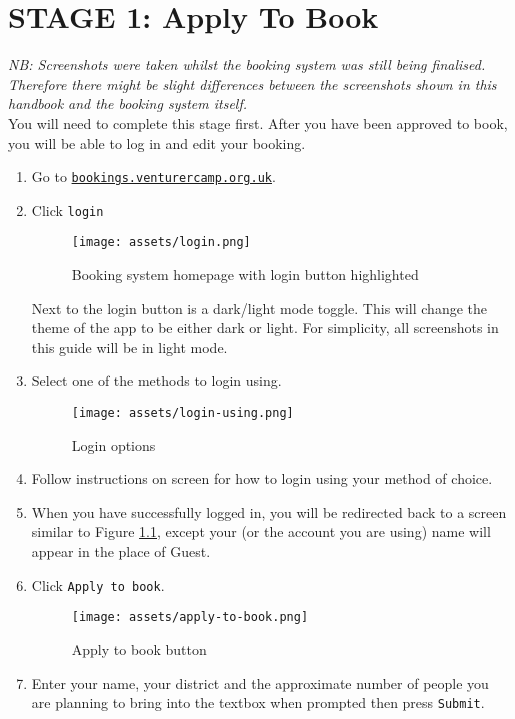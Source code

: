 \chapter{STAGE 1: Apply To Book}
\label{chap:apply}
\textit{NB: Screenshots were taken whilst the booking system was still being finalised. Therefore there might be slight differences between the screenshots shown in this handbook and the booking system itself.}\\[1em]
You will need to complete this stage first. After you have been approved to book, you will be able to log in and edit your booking.

\begin{enumerate}
    \item Go to \href{https://bookings.venturercamp.org.uk/}{\texttt{bookings.venturercamp.org.uk}}.
    \item Click \verb|login|
    \begin{figure}[H]
        \centering
        \texttt{[image: assets/login.png]}
        \caption{Booking system homepage with login button highlighted}
        \label{fig:login}
    \end{figure}
    Next to the login button is a dark/light mode toggle. This will change the theme of the app to be either dark or light. For simplicity, all screenshots in this guide will be in light mode.
    \item Select one of the methods to login using. 
    \begin{figure}[H]
        \centering
        \texttt{[image: assets/login-using.png]}
        \caption{Login options}
    \end{figure}
    \item Follow instructions on screen for how to login using your method of choice.
    \item When you have successfully logged in, you will be redirected back to a screen similar to Figure \ref*{fig:login}, except your (or the account you are using) name will appear in the place of Guest.
    \item Click \verb|Apply to book|.
    \begin{figure}[H]
        \centering
        \texttt{[image: assets/apply-to-book.png]}
        \caption{Apply to book button}
    \end{figure}
    \item Enter your name, your district and the approximate number of people you are planning to bring into the textbox when prompted then press \verb|Submit|.

\end{enumerate}
